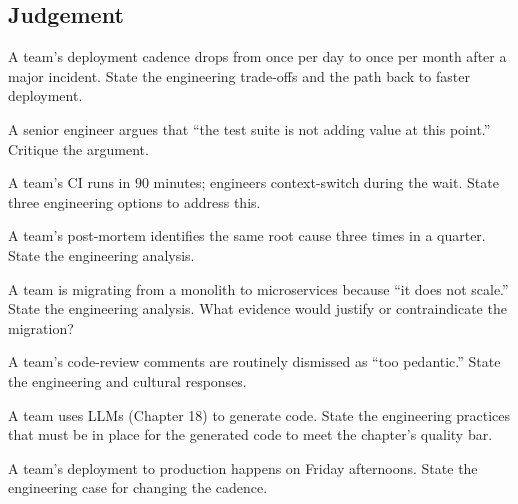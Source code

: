 \subsection*{Judgement}

\begin{exercise}
A team's deployment cadence drops from once per day to once per month after a major incident. State the engineering trade-offs and the path back to faster deployment.
\end{exercise}

\begin{exercise}
A senior engineer argues that ``the test suite is not adding value at this point.'' Critique the argument.
\end{exercise}

\begin{exercise}
A team's CI runs in $90$ minutes; engineers context-switch during the wait. State three engineering options to address this.
\end{exercise}

\begin{exercise}
A team's post-mortem identifies the same root cause three times in a quarter. State the engineering analysis.
\end{exercise}

\begin{exercise}
A team is migrating from a monolith to microservices because ``it does not scale.'' State the engineering analysis. What evidence would justify or contraindicate the migration?
\end{exercise}

\begin{exercise}
A team's code-review comments are routinely dismissed as ``too pedantic.'' State the engineering and cultural responses.
\end{exercise}

\begin{exercise}
A team uses LLMs (Chapter 18) to generate code. State the engineering practices that must be in place for the generated code to meet the chapter's quality bar.
\end{exercise}

\begin{exercise}
A team's deployment to production happens on Friday afternoons. State the engineering case for changing the cadence.
\end{exercise}

